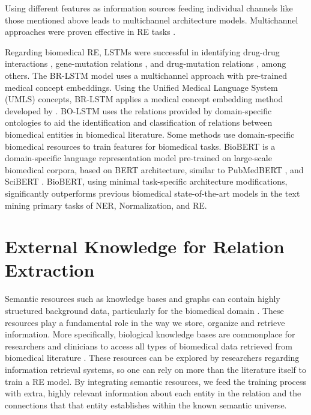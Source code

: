 Using different features as information sources feeding individual channels like those mentioned above leads to multichannel architecture models. Multichannel approaches were proven effective in RE tasks \citep{xu2015classifying}. 

Regarding biomedical RE, LSTMs were successful in identifying drug-drug interactions \citep{wang2017dependency}, gene-mutation relations \citep{song2018n}, and drug-mutation relations \citep{peng2017cross}, among others. The BR-LSTM \citep{xu2018leveraging} model uses a multichannel approach with pre-trained medical concept embeddings. Using the Unified Medical Language System (UMLS) concepts, BR-LSTM applies a medical concept embedding method developed by \cite{de2014medical}. BO-LSTM \citep{lamurias2019bo} uses the relations provided by domain-specific ontologies to aid the identification and classification of relations between biomedical entities in biomedical literature. Some methods use domain-specific biomedical resources to train features for biomedical tasks. BioBERT \citep{lee2020biobert} is a domain-specific language representation model pre-trained on large-scale biomedical corpora, based on BERT \citep{devlin2019bert} architecture, similar to PubMedBERT \citep{gu2021domain}, and SciBERT \citep{scibert}. BioBERT, using minimal task-specific architecture modifications, significantly outperforms previous biomedical state-of-the-art models in the text mining primary tasks of NER, Normalization, and RE. 

\section{External Knowledge for Relation Extraction}

Semantic resources such as knowledge bases and graphs can contain highly structured background data, particularly for the biomedical domain \citep{li2020bio}. These resources play a fundamental role in the way we store, organize and retrieve information. More specifically, biological knowledge bases are commonplace for researchers and clinicians to access all types of biomedical data retrieved from biomedical literature \citep{arnaboldi2020text}. These resources can be explored by researchers regarding information retrieval systems, so one can rely on more than the literature itself to train a RE model. By integrating semantic resources, we feed the training process with extra, highly relevant information about each entity in the relation and the connections that that entity establishes within the known semantic universe.

